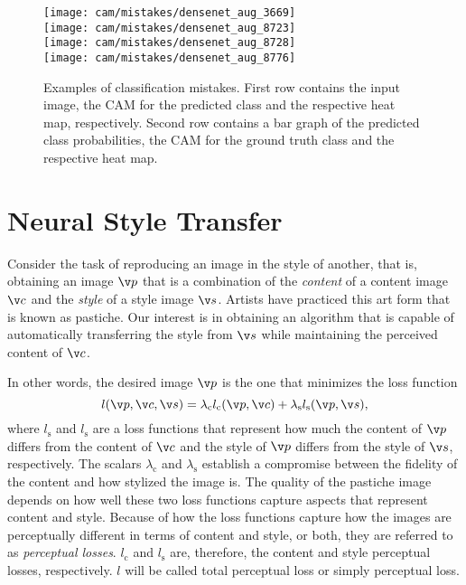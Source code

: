 \begin{figure}
	\centering
	\texttt{[image: cam/mistakes/densenet\_aug\_3669]}\\
	\texttt{[image: cam/mistakes/densenet\_aug\_8723]}\\
	\texttt{[image: cam/mistakes/densenet\_aug\_8728]}\\
	\texttt{[image: cam/mistakes/densenet\_aug\_8776]}
	\caption[Examples of classification mistakes.]{Examples of classification mistakes. First row contains the input image, the CAM for the predicted class and the respective heat map, respectively. Second row contains a bar graph of the predicted class probabilities, the CAM for the ground truth class and the respective heat map. \label{fig:cam-mistakes-densenet}}
\end{figure}

\section{Neural Style Transfer}
Consider the task of reproducing an image in the style of another, that is, obtaining an image $\v p$ that is a combination of the \textit{content} of a content image $\v c$ and the \textit{style} of a style image $\v s$. Artists have practiced this art form that is known as pastiche. Our interest is in obtaining an algorithm that is capable of automatically transferring the style from $\v s$ while maintaining the perceived content of $\v c$.

In other words, the desired image $\v p$ is the one that minimizes the loss function
\begin{equation}
l(\v p, \v c, \v s) = \lambda_\text{c} l_\text{c}(\v p, \v c) + \lambda_\text{s} l_\text{s}(\v p, \v s),
\end{equation}
where $l_\text{s}$ and $l_\text{s}$ are a loss functions that represent how much the content of $\v p$ differs from the content of $\v c$ and the style of $\v p$ differs from the style of $\v s$, respectively. The scalars $\lambda_\text{c}$ and $\lambda_\text{s}$ establish a compromise between the fidelity of the content and how stylized the image is. The quality of the pastiche image depends on how well these two loss functions capture aspects that represent content and style. Because of how the loss functions capture how the images are perceptually different in terms of content and style, or both, they are referred to as \textit{perceptual losses}. $l_\text{c}$ and $l_\text{s}$ are, therefore, the content and style perceptual losses, respectively. $l$ will be called total perceptual loss or simply perceptual loss.

